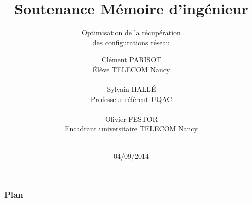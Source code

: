 \documentclass[11pt,compress]{beamer}
\begin{document}
\title{Soutenance Mémoire d'ingénieur}
\subtitle{Optimisation de la récupération\\des configurations réseau}
\author[Clément PARISOT]{
Clément PARISOT\\
\scriptsize \'{E}lève TELECOM Nancy\\[1cm]
\begin{columns}[t]
  \begin{column}{5cm}
   \centering
   \small Sylvain HALL\'{E}\\
   \scriptsize Professeur référent UQAC\\
  \end{column}
  \begin{column}{5cm}
   \centering
   \small Olivier FESTOR\\
   \scriptsize Encadrant universitaire TELECOM Nancy
  \end{column}
\end{columns}
\hfill\\[1cm]
}

\institute{}
\date{\scriptsize 04/09/2014}

{
\begin{frame}[plain]
  \titlepage
\end{frame}
}
\addtocounter{framenumber}{-1}

\begin{frame}
\frametitle{Plan}
\begin{columns}[t]
  \begin{column}{5cm}
  \tableofcontents[sections={1-3},hideothersubsections]
  \end{column}
  \begin{column}{5cm}
  \tableofcontents[sections={4-6},hideothersubsections]
  \end{column}
  \end{columns}
\end{frame}
\end{document}
